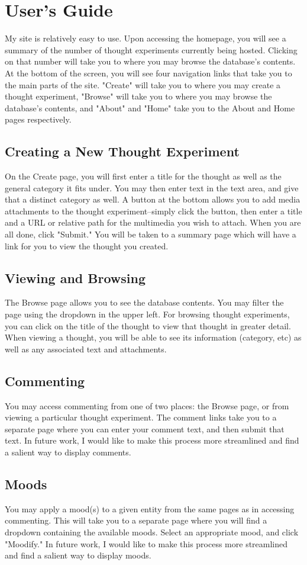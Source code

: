 \section{User's Guide}
My site is relatively easy to use.
Upon accessing the homepage, you will see a summary of the
number of thought experiments currently being hosted.
Clicking on that number will take you to where you may browse the database's
contents.
At the bottom of the screen, you will see four navigation links that take
you to the main parts of the site.
"Create" will take you to where you may create a thought experiment,
"Browse" will take you to where you may browse the database's contents,
and "About" and "Home" take you to the About and Home pages respectively.

\subsection{Creating a New Thought Experiment}
On the Create page, you will first enter a title for the thought
as well as the general category it fits under.
You may then enter text in the text area, and give that a distinct
category as well.
A button at the bottom allows you to add media attachments to the thought
experiment--simply click the button, then enter a title and a URL or relative
path for the multimedia you wish to attach.
When you are all done, click "Submit."
You will be taken to a summary page which will have a link for you to view the thought you created.

\subsection{Viewing and Browsing}
The Browse page allows you to see the database contents.
You may filter the page using the dropdown in the upper left.
For browsing thought experiments, you can click on the title of the
thought to view that thought in greater detail. When viewing
a thought, you will be able to see its information (category, etc)
as well as any associated text and attachments.

\subsection{Commenting}
You may access commenting from one of two places: the Browse page, or from
viewing a particular thought experiment.
The comment links take you to a separate page where you can enter your
comment text, and then submit that text.
In future work, I would like to make this process more streamlined and
find a salient way to display comments.

\subsection{Moods}
You may apply a mood(s) to a given entity from the same pages as in
accessing commenting. This will take you to a separate page
where you will find a dropdown containing the available moods.
Select an appropriate mood, and click "Moodify."
In future work, I would like to make this process more streamlined and
find a salient way to display moods.
